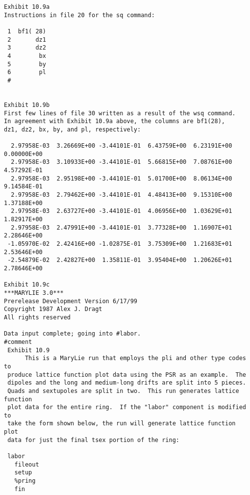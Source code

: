 \newpage
\begin{footnotesize}
\begin{verbatim}
Exhibit 10.9a
Instructions in file 20 for the sq command:

 1  bf1( 28)
 2       dz1
 3       dz2
 4        bx
 5        by
 6        pl
 #


Exhibit 10.9b
First few lines of file 30 written as a result of the wsq command.
In agreement with Exhibit 10.9a above, the columns are bf1(28),
dz1, dz2, bx, by, and pl, respectively:

  2.97958E-03  3.26669E+00 -3.44101E-01  6.43759E+00  6.23191E+00  0.00000E+00
  2.97958E-03  3.10933E+00 -3.44101E-01  5.66815E+00  7.08761E+00  4.57292E-01
  2.97958E-03  2.95198E+00 -3.44101E-01  5.01700E+00  8.06134E+00  9.14584E-01
  2.97958E-03  2.79462E+00 -3.44101E-01  4.48413E+00  9.15310E+00  1.37188E+00
  2.97958E-03  2.63727E+00 -3.44101E-01  4.06956E+00  1.03629E+01  1.82917E+00
  2.97958E-03  2.47991E+00 -3.44101E-01  3.77328E+00  1.16907E+01  2.28646E+00
 -1.05970E-02  2.42416E+00 -1.02875E-01  3.75309E+00  1.21683E+01  2.53646E+00
 -2.54879E-02  2.42827E+00  1.35811E-01  3.95404E+00  1.20626E+01  2.78646E+00

Exhibit 10.9c
***MARYLIE 3.0***
Prerelease Development Version 6/17/99
Copyright 1987 Alex J. Dragt
All rights reserved

Data input complete; going into #labor.
#comment
 Exhibit 10.9
      This is a MaryLie run that employs the pli and other type codes to
 produce lattice function plot data using the PSR as an example.  The
 dipoles and the long and medium-long drifts are split into 5 pieces.
 Quads and sextupoles are split in two.  This run generates lattice function
 plot data for the entire ring.  If the "labor" component is modified to
 take the form shown below, the run will generate lattice function plot
 data for just the final tsex portion of the ring:

 labor
   fileout
   setup
   %pring
   fin


\end{verbatim}
\end{footnotesize}
